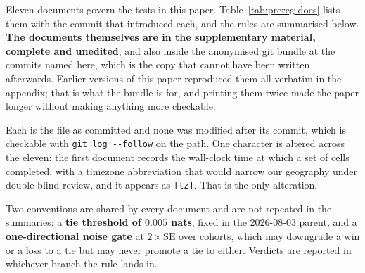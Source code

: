 Eleven documents govern the tests in this paper. Table~\ref{tab:prereg-docs}
lists them with the commit that introduced each, and the rules are
summarised below. \textbf{The documents themselves are in the supplementary
material, complete and unedited}, and also inside the anonymised git bundle
at the commits named here, which is the copy that cannot have been written
afterwards. Earlier versions of this paper reproduced them all verbatim in
the appendix; that is what the bundle is for, and printing them twice made
the paper longer without making anything more checkable.

Each is the file as committed and none was modified after its commit, which
is checkable with \texttt{git log -{}-follow} on the path. One character is
altered across the eleven: the first document records the wall-clock time at
which a set of cells completed, with a timezone abbreviation that would
narrow our geography under double-blind review, and it appears as
\texttt{[tz]}. That is the only alteration.

Two conventions are shared by every document and are not repeated in the
summaries: a \textbf{tie threshold of $0.005$ nats}, fixed in the
2026-08-03 parent, and a \textbf{one-directional noise gate} at
$2\times\mathrm{SE}$ over cohorts, which may downgrade a win or a loss to a
tie but may never promote a tie to either. Verdicts are reported in
whichever branch the rule lands in.

